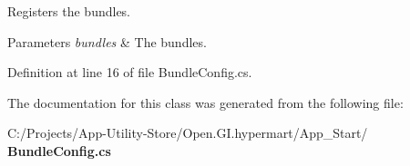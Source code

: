 Registers the bundles. 


\begin{DoxyParams}{Parameters}
{\em bundles} & The bundles.\\
\hline
\end{DoxyParams}


Definition at line 16 of file Bundle\+Config.\+cs.



The documentation for this class was generated from the following file\+:\begin{DoxyCompactItemize}
\item 
C\+:/\+Projects/\+App-\/\+Utility-\/\+Store/\+Open.\+G\+I.\+hypermart/\+App\+\_\+\+Start/\textbf{ Bundle\+Config.\+cs}\end{DoxyCompactItemize}
